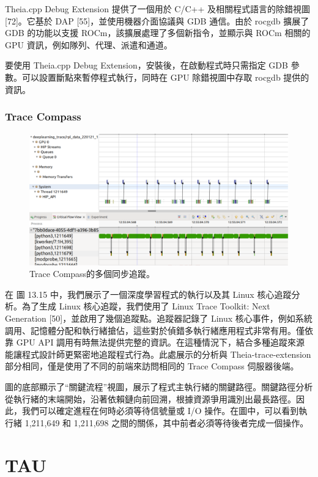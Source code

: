 Theia.cpp Debug Extension 提供了一個用於 C/C++ 及相關程式語言的除錯視圖 [72]。它基於 DAP [55]，並使用機器介面協議與 GDB 通信。由於 rocgdb 擴展了 GDB 的功能以支援 ROCm，該擴展處理了多個新指令，並顯示與 ROCm 相關的 GPU 資訊，例如隊列、代理、派遣和通道。

要使用 Theia.cpp Debug Extension，安裝後，在啟動程式時只需指定 GDB 參數。可以設置斷點來暫停程式執行，同時在 GPU 除錯視圖中存取 rocgdb 提供的資訊。


\subsubsection{Trace Compass}

\begin{figure}
    \centering
    \includegraphics[width=0.9\linewidth]{FileAusiliari/Screenshots/Figure13-15.png}
    \caption{Trace Compass的多個同步追蹤。}
    \label{fig:PAPI15}
\end{figure}

在 圖 13.15 中，我們展示了一個深度學習程式的執行以及其 Linux 核心追蹤分析。為了生成 Linux 核心追蹤，我們使用了 Linux Trace Toolkit: Next Generation [50]，並啟用了幾個追蹤點。追蹤器記錄了 Linux 核心事件，例如系統調用、記憶體分配和執行緒搶佔，這些對於偵錯多執行緒應用程式非常有用。僅依靠 GPU API 調用有時無法提供完整的資訊。在這種情況下，結合多種追蹤來源能讓程式設計師更緊密地追蹤程式行為。此處展示的分析與 Theia-trace-extension 部分相同，僅是使用了不同的前端來訪問相同的 Trace Compass 伺服器後端。

圖的底部顯示了“關鍵流程”視圖，展示了程式主執行緒的關鍵路徑。關鍵路徑分析從執行緒的末端開始，沿著依賴鏈向前回溯，根據資源爭用識別出最長路徑。因此，我們可以確定進程在何時必須等待信號量或 I/O 操作。在圖中，可以看到執行緒 1,211,649 和 1,211,698 之間的關係，其中前者必須等待後者完成一個操作。


\section{TAU}

